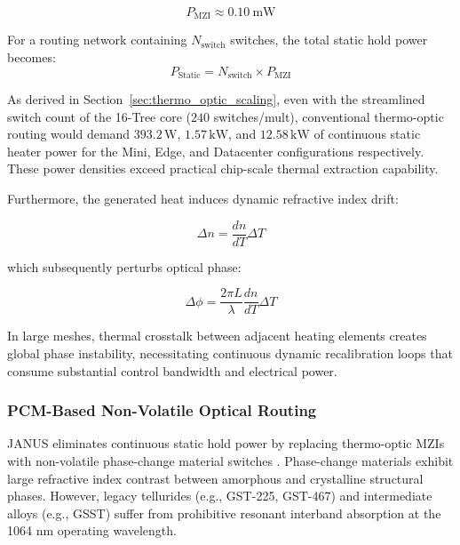 \documentclass[journal]{IEEEtran}
\begin{document}
\begin{equation}
P_{\mathrm{MZI}} \approx 0.10~\mathrm{mW}
\end{equation}

For a routing network containing $N_{\mathrm{switch}}$ switches, the total static hold power becomes:
\begin{equation}
P_{\mathrm{Static}} = N_{\mathrm{switch}}\times P_{\mathrm{MZI}}
\end{equation}

As derived in Section~\ref{sec:thermo_optic_scaling}, even with the streamlined switch count of the 16-Tree core ($240$ switches/mult), conventional thermo-optic routing would demand $393.2\,\mathrm{W}$, $1.57\,\mathrm{kW}$, and $12.58\,\mathrm{kW}$ of continuous static heater power for the Mini, Edge, and Datacenter configurations respectively. These power densities exceed practical chip-scale thermal extraction capability.

Furthermore, the generated heat induces dynamic refractive index drift:

\begin{equation}
\Delta n = \frac{dn}{dT}  \Delta T 
\end{equation}

which subsequently perturbs optical phase:

\begin{equation}
\Delta\phi = \frac{2\pi L}{\lambda}\frac{dn}{dT}\Delta T
\end{equation}

In large meshes, thermal crosstalk between adjacent heating elements creates global phase instability, necessitating continuous dynamic recalibration loops that consume substantial control bandwidth and electrical power.

\subsubsection{\textbf{PCM-Based Non-Volatile Optical Routing}}

JANUS eliminates continuous static hold power by replacing thermo-optic MZIs with non-volatile phase-change material switches \cite{Xu2019,Zhang2019,Delaney2020,Rios2021}. Phase-change materials exhibit large refractive index contrast between amorphous and crystalline structural phases. However, legacy tellurides (e.g., GST-225, GST-467) and intermediate alloys (e.g., GSST) suffer from prohibitive resonant interband absorption at the 1064 nm operating wavelength. 
\end{document}
